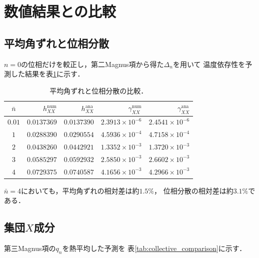 \documentclass[dvipdfmx,a4paper,10pt]{jsarticle}
\begin{document}
\section{数値結果との比較}

\subsection{平均角ずれと位相分散}

$n=0$の位相だけを較正し，第二Magnus項から得た$\Delta_n$を用いて
温度依存性を予測した結果を表\ref{tab:phase_comparison}に示す．

\begin{table}[htbp]
 \centering
 \small
 \caption{平均角ずれと位相分散の比較．}
 \label{tab:phase_comparison}
 \setlength{\tabcolsep}{5pt}
 \begin{tabular}{c@{\quad}rrrr}
  \toprule
  $\bar n$
  & $h_{XX}^{\mathrm{num}}$
  & $h_{XX}^{\mathrm{ana}}$
  & $\gamma_{XX}^{\mathrm{num}}$
  & $\gamma_{XX}^{\mathrm{ana}}$\\
  \midrule
  $0.01$ & $0.0137369$ & $0.0137390$ & $2.3913{\times}10^{-6}$ & $2.4541{\times}10^{-6}$\\
  $1$    & $0.0288390$ & $0.0290554$ & $4.5936{\times}10^{-4}$ & $4.7158{\times}10^{-4}$\\
  $2$    & $0.0438260$ & $0.0442921$ & $1.3352{\times}10^{-3}$ & $1.3720{\times}10^{-3}$\\
  $3$    & $0.0585297$ & $0.0592932$ & $2.5850{\times}10^{-3}$ & $2.6602{\times}10^{-3}$\\
  $4$    & $0.0729375$ & $0.0740587$ & $4.1656{\times}10^{-3}$ & $4.2966{\times}10^{-3}$\\
  \bottomrule
 \end{tabular}
\end{table}

$\bar n=4$においても，平均角ずれの相対差は約$1.5\%$，
位相分散の相対差は約$3.1\%$である．

\subsection{集団$X$成分}

第三Magnus項の$q_n$を熱平均した予測を
表\ref{tab:collective_comparison}に示す．
\end{document}
